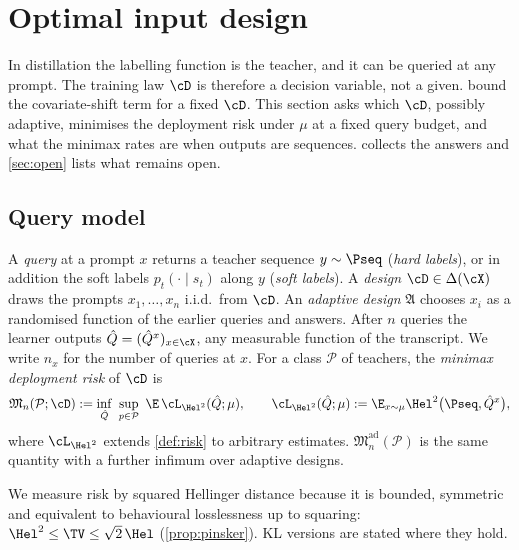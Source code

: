 \section{Optimal input design}\label{sec:design}

In distillation the labelling function is the teacher, and it can be queried at any prompt. The
training law $\cD$ is therefore a decision variable, not a given.  bound
the covariate-shift term for a fixed $\cD$. This section asks which
$\cD$, possibly adaptive, minimises the deployment risk under $\mu$ at a fixed query budget, and what
the minimax rates are when outputs are sequences.  collects the answers and
\cref{sec:open} lists what remains open.

\subsection{Query model}

\begin{definition}\label{def:design}
A \emph{query} at a prompt $x$ returns a teacher sequence $y\sim\Pseq$ (\emph{hard labels}), or in
addition the soft labels $p_t(\cdot\mid s_t)$ along $y$ (\emph{soft labels}). A \emph{design}
$\cD\in\Delta(\cX)$ draws the prompts $x_1,\dots,x_n$ i.i.d.\ from $\cD$. An \emph{adaptive design}
$\mathfrak A$ chooses $x_i$ as a randomised function of the earlier queries and answers. After $n$
queries the learner outputs $\hat Q=(\hat Q^x)_{x\in\cX}$, any measurable function of the transcript.
We write $n_x$ for the number of queries at $x$. For a class $\mathcal P$ of teachers, the
\emph{minimax deployment risk} of $\cD$ is
\[
\mathfrak M_n(\mathcal P;\cD):=\inf_{\hat Q}\ \sup_{p\in\mathcal P}\ \E\,\cL_{\Hel^2}(\hat Q;\mu),
\qquad\cL_{\Hel^2}(\hat Q;\mu):=\E_{x\sim\mu}\Hel^2\big(\Pseq,\hat Q^x\big),
\]
where $\cL_{\Hel^2}$ extends \cref{def:risk} to arbitrary estimates. $\mathfrak M^{\mathrm{ad}}_n(\mathcal P)$
is the same quantity with a further infimum over adaptive designs.
\end{definition}
\noindent
We measure risk by squared Hellinger distance because it is bounded, symmetric and equivalent to
behavioural losslessness up to squaring: $\Hel^2\le\TV\le\sqrt2\,\Hel$ (\cref{prop:pinsker}). KL versions
are stated where they hold.

